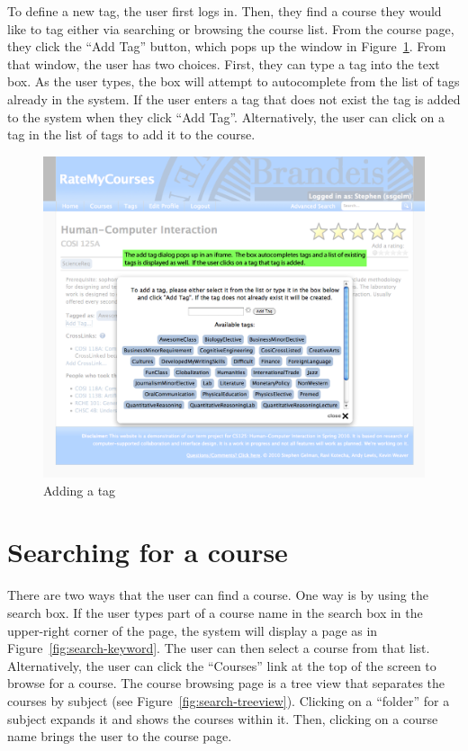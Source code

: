 \documentclass[12pt]{report}
\begin{document}
To define a new tag, the user first logs in.  Then, they find a course they would like to tag either via searching or browsing the course list.  From the course page, they click the ``Add Tag'' button, which pops up the window in Figure~\ref{fig:add-tag}. From that window, the user has two choices.  First, they can type a tag into the text box.  As the user types, the box will attempt to autocomplete from the list of tags already in the system.  If the user enters a tag that does not exist the tag is added to the system when they click ``Add Tag''.  Alternatively, the user can click on a tag in the list of tags to add it to the course.

\begin{figure}
\includegraphics[width=\textwidth]{narrative-1.png}
\caption{Adding a tag}
\label{fig:add-tag}
\end{figure}

\section{Searching for a course}

There are two ways that the user can find a course.  One way is by using the search box.  If the user types part of a course name in the search box in the upper-right corner of the page, the system will display a page as in Figure~\ref{fig:search-keyword}. The user can then select a course from that list.  Alternatively, the user can click the ``Courses'' link at the top of the screen to browse for a course.  The course browsing page is a tree view that separates the courses by subject (see Figure~\ref{fig:search-treeview}). Clicking on a ``folder'' for a subject expands it and shows the courses within it.  Then, clicking on a course name brings the user to the course page.
\end{document}
